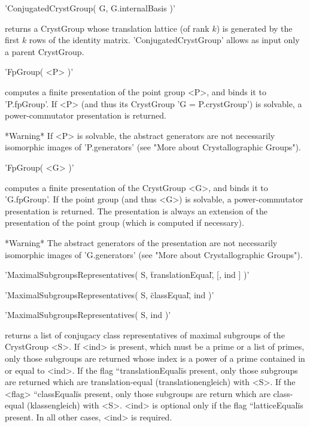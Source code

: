 'ConjugatedCrystGroup( G, G.internalBasis )'

returns a CrystGroup whose translation lattice (of rank $k$) is generated
by  the first  $k$  rows  of  the identity matrix. 'ConjugatedCrystGroup'
allows as input only a parent CrystGroup.

%

'FpGroup( <P> )'

computes a finite  presentation of the point  group <P>, and binds  it to
'P.fpGroup'.  If <P>  (and thus its  CrystGroup 'G  \:= P.crystGroup') is
solvable, a power-commutator presentation  is returned. 

*Warning\:*   If <P>  is  solvable, the     abstract generators are   not
necessarily   isomorphic   images  of  'P.generators'   (see  "More about
Crystallographic Groups").

%

'FpGroup( <G> )'

computes a finite  presentation of  the CrystGroup <G>,  and  binds it to
'G.fpGroup'.   If  the   point  group   (and thus  <G>)  is  solvable,  a
power-commutator presentation is  returned.  The  presentation  is always
an extension  of the presentation of the  point  group (which is computed
if necessary).   

*Warning\:*  The abstract  generators  of    the  presentation are    not
necessarily   isomorphic   images   of 'G.generators'  (see   "More about
Crystallographic Groups").

%

'MaximalSubgroupsRepresentatives( S, \"translationEqual\", [, ind ] )'

'MaximalSubgroupsRepresentatives( S, \"classEqual\", ind )'

'MaximalSubgroupsRepresentatives( S, ind )'

returns a list of conjugacy class representatives of maximal subgroups of
the CrystGroup <S>. If <ind> is present, which must  be a prime or a list
of primes, only those subgroups are returned whose index  is a power of a
prime contained  in or equal  to <ind>.  If the flag ``translationEqual\"
is present, only those subgroups are returned which are translation-equal
(translationengleich) with <S>.  If the <flag> ``classEqual\" is present,
only  those subgroups  are  return which are  class-equal (klassengleich)
with <S>. <ind> is optional only if the flag ``latticeEqual\" is present. 
In all other cases, <ind> is required.

